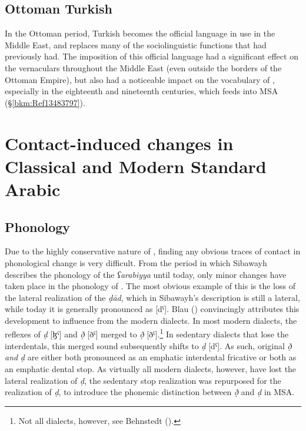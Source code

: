 \documentclass[output=paper]{langsci/langscibook}
\begin{document}
\subsection{Ottoman Turkish}

In the Ottoman period,  {Turkish} becomes the official language in use in the Middle East, and replaces many of the sociolinguistic functions that  had previously had. The {imposition} of this official language had a significant effect on the  vernaculars throughout the Middle East (even outside the borders of the Ottoman Empire), but also had a noticeable impact on the vocabulary of , especially in the eighteenth and nineteenth centuries, which feeds into MSA (§\ref{bkm:Ref13483797}).

\section{Contact-induced changes in Classical and Modern Standard Arabic}
\subsection{\label{bkm:Ref12953419}Phonology}

Due to the highly conservative nature of , finding any obvious traces of contact in phonological change is very difficult. From the period in which Sibawayh describes the phonology of the \textit{ʕarabiyya} until today, only minor changes have taken place in the phonology of . The most obvious example of this is the loss of the lateral realization of the \textit{ḍād}, which in Sibawayh’s description is still a lateral, while today it is generally pronounced as [dˤ]. Blau (\citeyear[162--163]{Blau1969}) convincingly attributes this development to influence from the modern dialects. In most modern  dialects, the reflexes of \textit{ḍ} [ɮˤ] and \textit{ð̣} [ðˤ] {merged} to \textit{ð̣} [ðˤ].\footnote{Not all dialects, however, see Behnstedt (\citeyear[16ff.]{Behnstedt2016Yemen}).} In sedentary dialects that lose the interdentals, this {merged} sound subsequently shifts to \textit{ḍ} [dˤ]. As such, original \textit{ð̣} \textit{and} \textit{ḍ} are either both pronounced as an {emphatic} interdental fricative or both as an {emphatic} dental stop. As virtually all modern dialects, however, have lost the lateral realization of \textit{ḍ}, the sedentary stop realization was repurposed for the realization of \textit{ḍ}, to introduce the phonemic distinction between \textit{ð̣} and \textit{ḍ} in MSA.
\end{document}
